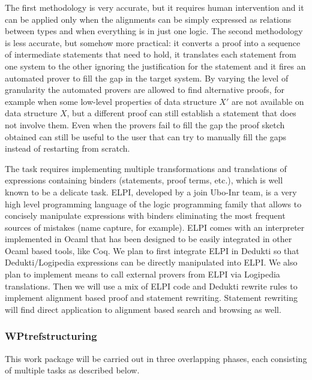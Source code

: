 The first methodology is very accurate, but it requires human
intervention and it can be applied only when the alignments can be
simply expressed as relations between types and when everything is in
just one logic. The second methodology is less accurate, but somehow
more practical: it converts a proof into a sequence of intermediate
statements that need to hold, it translates each statement from one
system to the other ignoring the justification for the statement and
it fires an automated prover to fill the gap in the target system. By
varying the level of granularity the automated provers are allowed to
find alternative proofs, for example when some low-level properties of
data structure $X'$ are not available on data structure $X$, but a
different proof can still establish a statement that does not involve
them. Even when the provers fail to fill the gap the proof sketch
obtained can still be useful to the user that can try to manually fill
the gaps instead of restarting from scratch.

The task requires implementing multiple transformations and
translations of expressions containing binders (statements, proof
terms, etc.), which is well known to be a delicate task. ELPI,
developed by a join Ubo-Inr team, is a very high level programming
language of the logic programming family that allows to concisely
manipulate expressions with binders eliminating the most frequent
sources of mistakes (name capture, for example). ELPI comes with an
interpreter implemented in Ocaml that has been designed to be easily
integrated in other Ocaml based tools, like Coq. We plan to first
integrate ELPI in Dedukti so that Dedukti/Logipedia expressions can be
directly manipulated into ELPI. We also plan to implement means to
call external provers from ELPI via Logipedia translations. Then we
will use a mix of ELPI code and Dedukti rewrite rules to implement
alignment based proof and statement rewriting. Statement rewriting
will find direct application to alignment based search and browsing as
well.

\subsubsection{WPtref{structuring}}

This work package will be carried out in three overlapping phases, each consisting of multiple tasks as described below.


